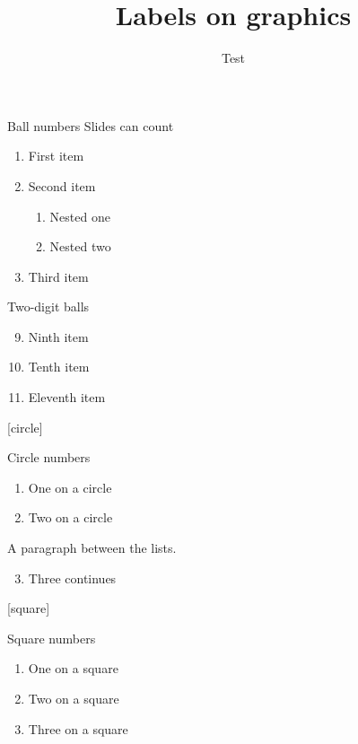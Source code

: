 \documentclass[aspectratio=169]{beamer}
\title{Labels on graphics}
\author{Test}
\date{}
\begin{document}
\begin{frame}{Ball numbers Slides can count}
  \begin{enumerate}
    \item First item
    \item Second item
      \begin{enumerate}
        \item Nested one
        \item Nested two
      \end{enumerate}
    \item Third item
  \end{enumerate}
\end{frame}

\begin{frame}{Two-digit balls}
  \begin{enumerate}
    \setcounter{enumi}{8}
    \item Ninth item
    \item Tenth item
    \item Eleventh item
  \end{enumerate}
\end{frame}

{
[circle]
\begin{frame}{Circle numbers}
  \begin{enumerate}
    \item One on a circle
    \item Two on a circle
  \end{enumerate}
  A paragraph between the lists.
  \begin{enumerate}
    \setcounter{enumi}{2}
    \item Three continues
  \end{enumerate}
\end{frame}
}

{
[square]
\begin{frame}{Square numbers}
  \begin{enumerate}
    \item One on a square
    \item Two on a square
    \item Three on a square
  \end{enumerate}
\end{frame}
}
\end{document}

